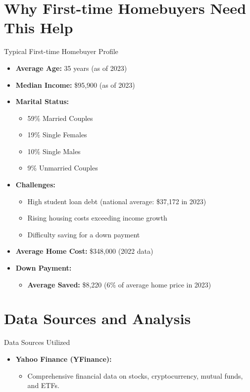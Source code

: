 \documentclass{beamer}
\begin{document}
\section{Why First-time Homebuyers Need This Help}
\begin{frame}{Typical First-time Homebuyer Profile}
  \begin{itemize}
    \item \textbf{Average Age:} 35 years (as of 2023)
    \item \textbf{Median Income:} \$95,900 (as of 2023)
    \item \textbf{Marital Status:}
    \begin{itemize}
        \item 59\% Married Couples
        \item 19\% Single Females
        \item 10\% Single Males
        \item 9\% Unmarried Couples
    \end{itemize}
    \item \textbf{Challenges:}
    \begin{itemize}
        \item High student loan debt (national average: \$37,172 in 2023)
        \item Rising housing costs exceeding income growth
        \item Difficulty saving for a down payment
    \end{itemize}
    \item \textbf{Average Home Cost:} \$348,000 (2022 data)
    \item \textbf{Down Payment:}
    \begin{itemize}
        \item \textbf{Average Saved:} \$8,220 (6\% of average home price in 2023)
    \end{itemize}
  \end{itemize}
\end{frame}

\section{Data Sources and Analysis}
\begin{frame}{Data Sources Utilized}
    \begin{itemize}
        \item \textbf{Yahoo Finance (YFinance):}
        \begin{itemize}
            \item Comprehensive financial data on stocks, cryptocurrency, mutual funds, and ETFs.
        \end{itemize}
    \end{itemize}
\end{frame}
\end{document}
